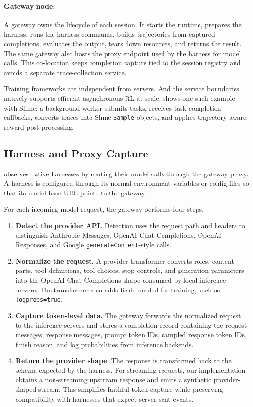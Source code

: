 \paragraph{Gateway node.}
A gateway owns the lifecycle of each session. It starts the runtime, prepares the harness, runs the harness commands, builds trajectories from captured completions, evaluates the output, tears down resources, and returns the result. The same gateway also hosts the proxy endpoint used by the harness for model calls. This co-location keeps completion capture tied to the session registry and avoids a separate trace-collection service.


Training frameworks are independent from \polar servers. And the service boundaries natively supports efficient asynchronous RL at scale.  shows one such example with Slime: a background worker submits \polar tasks, receives task-completion callbacks, converts traces into Slime \texttt{Sample} objects, and applies trajectory-aware reward post-processing.


\subsection{Harness and Proxy Capture}

\polar observes native harnesses by routing their model calls through the gateway proxy. A harness is configured through its normal environment variables or config files so that its model base URL points to the gateway.

For each incoming model request, the gateway performs four steps.

\begin{enumerate}
    \item \textbf{Detect the provider API.} Detection uses the request path and headers to distinguish Anthropic Messages, OpenAI Chat Completions, OpenAI Responses, and Google \texttt{generateContent}-style calls.
    \item \textbf{Normalize the request.} A provider transformer converts roles, content parts, tool definitions, tool choices, stop controls, and generation parameters into the OpenAI Chat Completions shape consumed by local inference servers. The transformer also adds fields needed for training, such as \texttt{logprobs=true}.
    \item \textbf{Capture token-level data.} The gateway forwards the normalized request to the inference servers and stores a completion record containing the request messages, response messages, prompt token IDs, sampled response token IDs, finish reason, and log probabilities from inference backends.
    \item \textbf{Return the provider shape.} The response is transformed back to the schema expected by the harness. For streaming requests, our implementation obtains a non-streaming upstream response and emits a synthetic provider-shaped stream. This simplifies faithful token capture while preserving compatibility with harnesses that expect server-sent events.
\end{enumerate}

